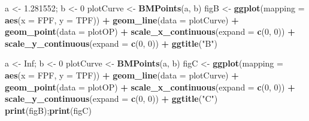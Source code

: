 \documentclass[
]{book}
\newenvironment{Shaded}{\begin{snugshade}}{\end{snugshade}}
\newcommand{\DataTypeTok}[1]{\textcolor[rgb]{0.13,0.29,0.53}{#1}}
\newcommand{\DecValTok}[1]{\textcolor[rgb]{0.00,0.00,0.81}{#1}}
\newcommand{\FloatTok}[1]{\textcolor[rgb]{0.00,0.00,0.81}{#1}}
\newcommand{\KeywordTok}[1]{\textcolor[rgb]{0.13,0.29,0.53}{\textbf{#1}}}
\newcommand{\NormalTok}[1]{#1}
\newcommand{\OperatorTok}[1]{\textcolor[rgb]{0.81,0.36,0.00}{\textbf{#1}}}
\newcommand{\OtherTok}[1]{\textcolor[rgb]{0.56,0.35,0.01}{#1}}
\newcommand{\StringTok}[1]{\textcolor[rgb]{0.31,0.60,0.02}{#1}}
\begin{document}
\begin{Shaded}
\begin{Highlighting}[]
\NormalTok{a \textless{}{-}}\StringTok{ }\FloatTok{1.281552}\NormalTok{; b \textless{}{-}}\StringTok{ }\DecValTok{0}
\NormalTok{plotCurve \textless{}{-}}\StringTok{ }\KeywordTok{BMPoints}\NormalTok{(a, b)}
\NormalTok{figB \textless{}{-}}\StringTok{ }\KeywordTok{ggplot}\NormalTok{(}\DataTypeTok{mapping =} \KeywordTok{aes}\NormalTok{(}\DataTypeTok{x =}\NormalTok{ FPF, }\DataTypeTok{y =}\NormalTok{ TPF)) }\OperatorTok{+}\StringTok{ }
\StringTok{  }\KeywordTok{geom\_line}\NormalTok{(}\DataTypeTok{data =}\NormalTok{ plotCurve) }\OperatorTok{+}\StringTok{ }
\StringTok{  }\KeywordTok{geom\_point}\NormalTok{(}\DataTypeTok{data =}\NormalTok{ plotOP)  }\OperatorTok{+}\StringTok{ }
\StringTok{  }\KeywordTok{scale\_x\_continuous}\NormalTok{(}\DataTypeTok{expand =} \KeywordTok{c}\NormalTok{(}\DecValTok{0}\NormalTok{, }\DecValTok{0}\NormalTok{)) }\OperatorTok{+}\StringTok{ }
\StringTok{  }\KeywordTok{scale\_y\_continuous}\NormalTok{(}\DataTypeTok{expand =} \KeywordTok{c}\NormalTok{(}\DecValTok{0}\NormalTok{, }\DecValTok{0}\NormalTok{)) }\OperatorTok{+}
\StringTok{  }\KeywordTok{ggtitle}\NormalTok{(}\StringTok{"B"}\NormalTok{)}

\NormalTok{a \textless{}{-}}\StringTok{ }\OtherTok{Inf}\NormalTok{; b \textless{}{-}}\StringTok{ }\DecValTok{0}
\NormalTok{plotCurve \textless{}{-}}\StringTok{ }\KeywordTok{BMPoints}\NormalTok{(a, b)}
\NormalTok{figC \textless{}{-}}\StringTok{ }\KeywordTok{ggplot}\NormalTok{(}\DataTypeTok{mapping =} \KeywordTok{aes}\NormalTok{(}\DataTypeTok{x =}\NormalTok{ FPF, }\DataTypeTok{y =}\NormalTok{ TPF)) }\OperatorTok{+}\StringTok{ }
\StringTok{  }\KeywordTok{geom\_line}\NormalTok{(}\DataTypeTok{data =}\NormalTok{ plotCurve) }\OperatorTok{+}\StringTok{ }
\StringTok{  }\KeywordTok{geom\_point}\NormalTok{(}\DataTypeTok{data =}\NormalTok{ plotOP)  }\OperatorTok{+}\StringTok{ }
\StringTok{  }\KeywordTok{scale\_x\_continuous}\NormalTok{(}\DataTypeTok{expand =} \KeywordTok{c}\NormalTok{(}\DecValTok{0}\NormalTok{, }\DecValTok{0}\NormalTok{)) }\OperatorTok{+}\StringTok{ }
\StringTok{  }\KeywordTok{scale\_y\_continuous}\NormalTok{(}\DataTypeTok{expand =} \KeywordTok{c}\NormalTok{(}\DecValTok{0}\NormalTok{, }\DecValTok{0}\NormalTok{)) }\OperatorTok{+}
\StringTok{  }\KeywordTok{ggtitle}\NormalTok{(}\StringTok{"C"}\NormalTok{)}
\KeywordTok{print}\NormalTok{(figB);}\KeywordTok{print}\NormalTok{(figC)}
\end{Highlighting}
\end{Shaded}
\end{document}
